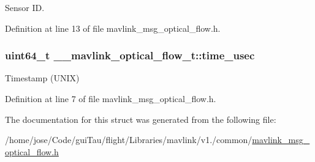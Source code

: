 Sensor I\-D. 



Definition at line 13 of file mavlink\-\_\-msg\-\_\-optical\-\_\-flow.\-h.

\hypertarget{struct____mavlink__optical__flow__t_a01f76c236ab67155fe7770f82eb86ad6}{
\subsubsection[{time\-\_\-usec}]{\setlength{\rightskip}{0pt plus 5cm}uint64\-\_\-t \-\_\-\-\_\-mavlink\-\_\-optical\-\_\-flow\-\_\-t\-::time\-\_\-usec}}\label{struct____mavlink__optical__flow__t_a01f76c236ab67155fe7770f82eb86ad6}


Timestamp (U\-N\-I\-X) 



Definition at line 7 of file mavlink\-\_\-msg\-\_\-optical\-\_\-flow.\-h.



The documentation for this struct was generated from the following file\-:\begin{DoxyCompactItemize}
\item 
/home/jose/\-Code/gui\-Tau/flight/\-Libraries/mavlink/v1./common/\hyperlink{mavlink__msg__optical__flow_8h}{mavlink\-\_\-msg\-\_\-optical\-\_\-flow.\-h}\end{DoxyCompactItemize}
